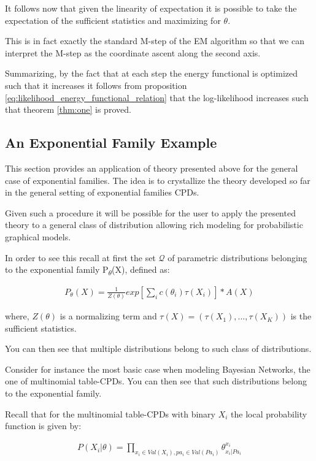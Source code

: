 \documentclass[11pt]{article}
\begin{document}
\begin{article}
It follows now that given the linearity of expectation it is
possible to take the expectation of the sufficient statistics and
maximizing for \(\theta\).

This is in fact exactly the standard M-step of the EM algorithm so
that we can interpret the M-step as the coordinate ascent along
the second axis. 

Summarizing, by the fact that at each step the energy functional is
optimized such that it increases it follows from proposition
\ref{eq:likelihood_energy_functional_relation} that the
log-likelihood increases such that theorem \ref{thm:one} is proved.


\subsection{An Exponential Family Example}
\label{sec:orge8be57b}

This section provides an application of theory presented above for
the general case of exponential families. The idea is to
crystallize the theory developed so far in the general setting of
exponential families CPDs.

Given such a procedure it will be possible for the user to apply
the presented theory to a general class of distribution allowing
rich modeling for probabilistic graphical models.

In order to see this recall at first the set \(\mathscr{Q}\) of
parametric distributions belonging to the exponential family
P\textsubscript{\(\theta\)}(X), defined as:

\begin{align} \label{eq:exponential-family}
P_{\theta}(X) = \frac{1}{Z(\theta)} exp[\sum_i c(\theta_i)\tau(X_i)] * A(X)
\end{align}

where, \(Z(\theta)\) is a normalizing term and \(\tau(X) = (\tau(X_1),
    ..., \tau(X_K))\) is the sufficient statistics.

You can then see that multiple distributions belong to such class
of distributions.

Consider for instance the most basic case when modeling Bayesian
Networks, the one of multinomial table-CPDs. You can then see that
such distributions belong to the exponential family.

Recall that for the multinomial table-CPDs with binary \(X_i\) the
local probability function is given by:

\begin{align} \label{eq:multinomial-cpd}
P(X_i|\theta) = \prod_{x_i \in Val(X_i), pa_i \in Val(Pa_i)} \theta_{x_i | Pa_i}^{x_i}
\end{align}


\end{article}
\end{document}
